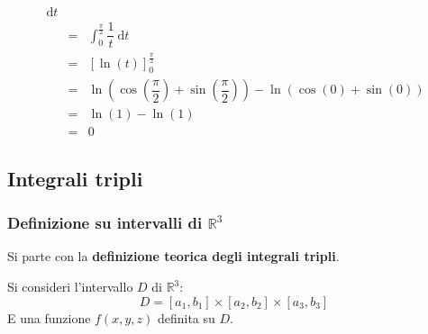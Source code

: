 \documentclass[a4paper]{article}
\begin{document}
\begin{equation*}
\begin{array}{rcl}
			\:\mathrm{d}t \\ [1.5em]
			&=&
			\displaystyle\int_{0}^{\frac{\pi}{2}} \dfrac{1}{t} \:\mathrm{d}t \\ [1.5em]
			&=&
			\left[\ln\left(t\right)\right]_{0}^{\frac{\pi}{2}} \\ [1em]
			&=&
			\ln\left(\cos\left(\dfrac{\pi}{2}\right) + \sin\left(\dfrac{\pi}{2}\right)\right) - \ln\left(\cos\left(0\right) + \sin\left(0\right)\right) \\ [1em]
			&=&
			\ln\left(1\right) - \ln\left(1\right) \\ [.5em]
			&=& 0
		\end{array}
	\end{equation*}

	\newpage

	\subsection{Integrali tripli}\label{subsection: integrali tripli}

	\subsubsection{Definizione su intervalli di $\mathbb{R}^{3}$}\label{subsubsection: definizione su intervalli di R3}

	Si parte con la \textbf{definizione teorica degli integrali tripli}.\newline

	\noindent
	Si consideri l'intervallo $D$ di $\mathbb{R}^{3}$:
	\begin{equation*}
		D = \left[a_{1}, b_{1}\right] \times \left[a_{2}, b_{2}\right] \times \left[a_{3}, b_{3}\right]
	\end{equation*}
	E una funzione $f\left(x,y,z\right)$ definita su $D$.\newline
\end{document}

